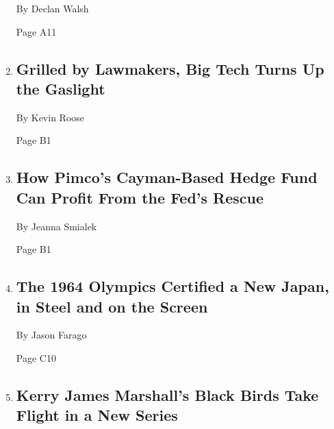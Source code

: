 \begin{enumerate}
  By Declan Walsh

  Page A11
\item
  \href{/2020/07/30/technology/big-tech-ceos.html}{}

  \hypertarget{grilled-by-lawmakers-big-tech-turns-up-the-gaslight}{%
  \subsection{Grilled by Lawmakers, Big Tech Turns Up the
  Gaslight}\label{grilled-by-lawmakers-big-tech-turns-up-the-gaslight}}

  By Kevin Roose

  Page B1
\item
  \href{/2020/07/30/business/economy/fed-talf-wall-street.html}{}

  \hypertarget{how-pimcos-cayman-based-hedge-fund-can-profit-from-the-feds-rescue}{%
  \subsection{How Pimco's Cayman-Based Hedge Fund Can Profit From the
  Fed's
  Rescue}\label{how-pimcos-cayman-based-hedge-fund-can-profit-from-the-feds-rescue}}

  By Jeanna Smialek

  Page B1
\item
  \href{/2020/07/30/arts/design/tokyo-olympics-1964-design.html}{}

  \hypertarget{the-1964-olympics-certified-a-new-japan-in-steel-and-on-the-screen}{%
  \subsection{The 1964 Olympics Certified a New Japan, in Steel and on
  the
  Screen}\label{the-1964-olympics-certified-a-new-japan-in-steel-and-on-the-screen}}

  By Jason Farago

  Page C10
\item
  \href{/2020/07/29/arts/design/kerry-james-marshall-audubon.html}{}

  \hypertarget{kerry-james-marshalls-black-birds-take-flight-in-a-new-series}{%
  \subsection{Kerry James Marshall's Black Birds Take Flight in a New
  Series}\label{kerry-james-marshalls-black-birds-take-flight-in-a-new-series}}


\end{enumerate}
